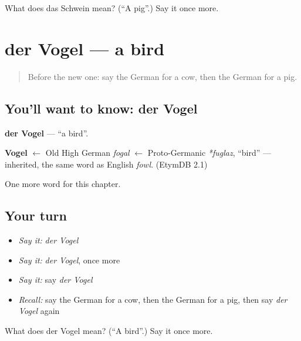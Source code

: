 \begin{tcolorbox}[breakable,colback=teal!4,colframe=teal!35!black,title={Before you move on}]
What does das Schwein mean? (\textquotedblleft{}A pig\textquotedblright{}.) Say it once more.
\end{tcolorbox}
\section[der Vogel]{der Vogel — a bird}

\label{lesson:GE-C86-vogel}



\begin{quote}
Before the new one: say the German for a cow, then the German for a pig.
\end{quote}

\subsection*{You'll want to know: der Vogel}
\textbf{der Vogel} — \textquotedblleft{}a bird\textquotedblright{}.

\begin{cousinweb}
\textbf{Vogel} $\leftarrow$ Old High German \emph{fogal} $\leftarrow$ Proto-Germanic \emph{*fuglaz}, \textquotedblleft{}bird\textquotedblright{} — inherited, the same word as English \emph{fowl}. (EtymDB 2.1)
\end{cousinweb}

\begin{grammarlens}[title={What you've built}]
One more word for this chapter.
\end{grammarlens}

\subsection*{Your turn}
\begin{itemize}
\raggedright
  \item \emph{Say it:} \emph{der Vogel}
  \item \emph{Say it:} \emph{der Vogel}, once more
  \item \emph{Say it:} say \emph{der Vogel}
  \item \emph{Recall:} say the German for a cow, then the German for a pig, then say \emph{der Vogel} again
\end{itemize}

\begin{tcolorbox}[breakable,colback=teal!4,colframe=teal!35!black,title={Before you move on}]
What does der Vogel mean? (\textquotedblleft{}A bird\textquotedblright{}.) Say it once more.
\end{tcolorbox}
